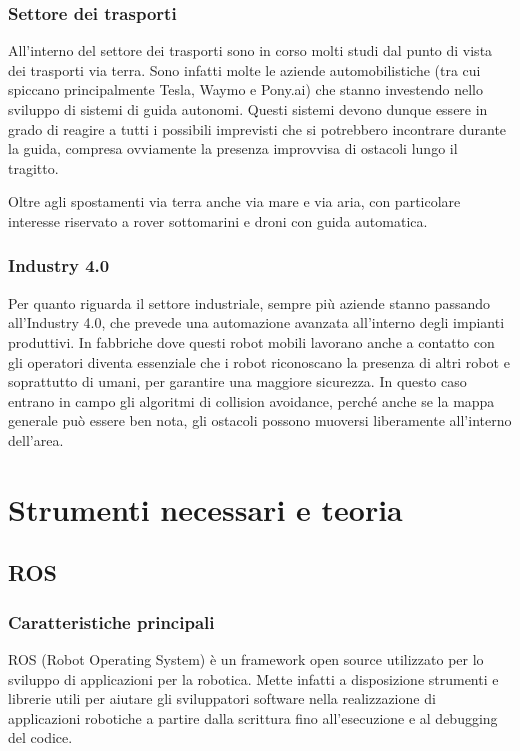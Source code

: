 \documentclass[Lau, binding=0.6cm, oneside]{sapthesis}
\begin{document}
\subsection{Settore dei trasporti}
All'interno del settore dei trasporti sono in corso molti studi dal punto di vista dei trasporti via terra.
Sono infatti molte le aziende automobilistiche (tra cui spiccano principalmente Tesla, Waymo e Pony.ai) che stanno investendo nello sviluppo di sistemi di guida autonomi.
Questi sistemi devono dunque essere in grado di reagire a tutti i possibili imprevisti che si potrebbero incontrare durante la guida, compresa ovviamente la presenza improvvisa di ostacoli lungo il tragitto.

Oltre agli spostamenti via terra anche via mare e via aria, con particolare interesse riservato a rover sottomarini e droni con guida automatica.

\subsection{Industry 4.0}
Per quanto riguarda il settore industriale, sempre più aziende stanno passando all'Industry 4.0, che prevede una automazione avanzata all'interno degli impianti produttivi.
In fabbriche dove questi robot mobili lavorano anche a contatto con gli operatori diventa essenziale che i robot riconoscano la presenza di altri robot e soprattutto di umani, per garantire una maggiore sicurezza.
In questo caso entrano in campo gli algoritmi di collision avoidance, perché anche se la mappa generale può essere ben nota, gli ostacoli possono muoversi liberamente all'interno dell'area.

\chapter{Strumenti necessari e teoria}
\section{ROS}
\subsection{Caratteristiche principali}
ROS (Robot Operating System) è un framework open source utilizzato per lo sviluppo di applicazioni per la robotica.
Mette infatti a disposizione strumenti e librerie utili per aiutare gli sviluppatori software nella realizzazione di applicazioni robotiche a partire dalla scrittura fino all’esecuzione e al debugging del codice.
\end{document}
